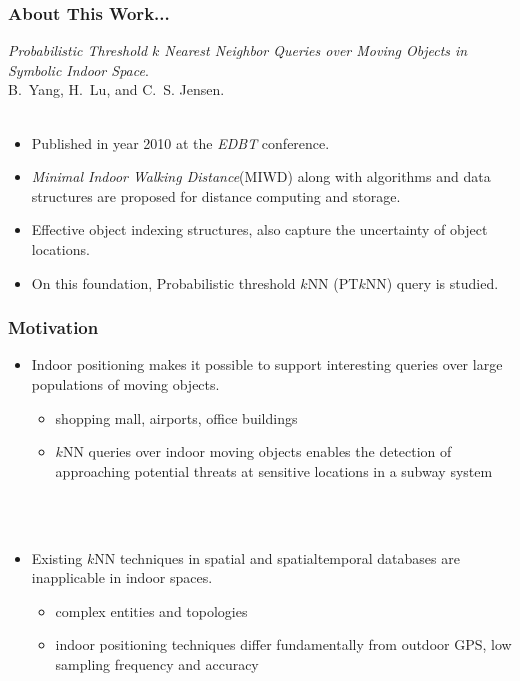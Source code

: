 \begin{frame}
\frametitle{About This Work...}

\emph{Probabilistic Threshold $k$ Nearest Neighbor Queries over Moving Objects in Symbolic Indoor Space}.~\cite{DBLP:conf/edbt/YangLJ10} \\
B.~Yang, H.~Lu, and C.~S. Jensen.\\~\\

\begin{itemize}
  \item Published in year 2010 at the \emph{EDBT} conference.
  \item \emph{Minimal Indoor Walking Distance}(MIWD) along with algorithms and data structures are proposed for distance computing and storage.
  \item Effective object indexing structures, also capture the uncertainty of object locations.
  \item On this foundation, Probabilistic threshold $k$NN (PT$k$NN) query is studied.
\end{itemize}

\end{frame}

\begin{frame}
\frametitle{Motivation}

\begin{itemize}
  \item Indoor positioning makes it possible to support interesting queries over large populations of moving objects.
    \begin{itemize}
      \item shopping mall, airports, office buildings
      \item $k$NN queries over indoor moving objects enables the detection of approaching potential threats at sensitive locations in a subway system
    \end{itemize}
  \\~\\
  \item Existing $k$NN techniques in spatial and spatialtemporal databases are inapplicable in indoor spaces.
    \begin{itemize}
      \item complex entities and topologies
      \item indoor positioning techniques differ fundamentally from outdoor GPS, low sampling frequency and accuracy
    \end{itemize}
\end{itemize}

\end{frame}

